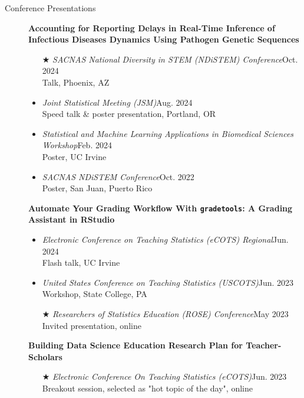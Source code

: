 \documentclass{article}
\begin{document}
	\begin{description}
		\vspace{-2mm}
		\item[Conference Presentations]\hspace*{.1in}
		
		\textbf{Accounting for Reporting Delays in Real-Time Inference of Infectious Diseases Dynamics Using Pathogen Genetic Sequences}
		\begin{itemize}
			\item[$\bigstar$] \textit{SACNAS National Diversity in STEM (NDiSTEM) Conference}\hfill{Oct. 2024}\\
			Talk, Phoenix, AZ
			
			\item \textit{Joint Statistical Meeting (JSM)}\hfill{Aug. 2024}\\
			Speed talk \& poster presentation, Portland, OR
			
			\item \textit{Statistical and Machine Learning Applications in Biomedical Sciences Workshop}\hfill{Feb. 2024}\\
			Poster, UC Irvine
			
			\item \textit{SACNAS NDiSTEM Conference}\hfill{Oct. 2022}\\ 
			Poster, San Juan, Puerto Rico 
		\end{itemize}
		
		\textbf{Automate Your Grading Workflow With \texttt{gradetools}: A Grading Assistant in RStudio}
		\begin{itemize}
			\item \textit{Electronic Conference on Teaching Statistics (eCOTS) Regional}\hfill{Jun. 2024}\\
			Flash talk, UC Irvine
			
			\item \textit{United States Conference on Teaching Statistics (USCOTS)}\hfill{Jun. 2023}\\
			Workshop, State College, PA
			
			\item[$\bigstar$] \textit{Researchers of Statistics Education (ROSE) Conference}\hfill{May 2023}\\
			Invited presentation, online
		\end{itemize}
		
		\textbf{Building Data Science Education Research Plan for Teacher-Scholars}
		\begin{itemize}
			\item[$\bigstar$] \textit{Electronic Conference On Teaching Statistics (eCOTS)}\hfill{Jun. 2023}\\
			Breakout session, selected as "hot topic of the day", online
		\end{itemize}
		

\end{description}
\end{document}
